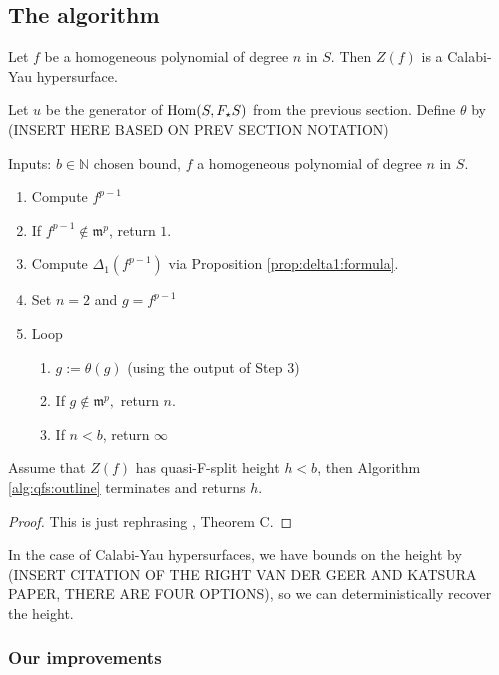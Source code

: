 \subsection{The algorithm}

Let \(f\) be a homogeneous polynomial of degree \(n\) 
in \(S\). 
Then \(Z(f)\) is a Calabi-Yau hypersurface.

Let \(u\) be the generator of \(\operatorname{Hom}(S,F_{\star}S)\) from the 
previous section.
Define \(\theta\) by  (INSERT HERE BASED ON PREV SECTION NOTATION)

\begin{alg}
	\label{alg:qfs:outline}

	Inputs: \(b \in \mathbb{N}\) chosen bound, \(f\) a homogeneous
	polynomial of degree \(n\) in \(S\).
	\begin{enumerate}[(1)]
		\item Compute \(f^{p-1}\)
		\item If \(f^{p-1} \notin \mathfrak{m}^{p}\), return \(1\). 
		\item Compute \(\Delta_{1}(f^{p-1})\) via Proposition \ref{prop:delta1:formula}.
		\item Set \(n = 2\) and \(g = f^{p-1}\)
		\item Loop
			\begin{enumerate}[(1)]
				\item \(g := \theta(g)\) (using the output of Step 3)
				\item If \(g \notin \mathfrak{m}^{p},\) return \(n\).
				\item If \(n < b\), return \(\infty\)	
			\end{enumerate}
	\end{enumerate}
\end{alg}

\begin{thm}
	Assume that
	\(Z(f)\) has quasi-F-split height \(h < b\),
	then Algorithm \ref{alg:qfs:outline} terminates
	and returns \(h\).
\end{thm}

\begin{proof}
	This is just rephrasing \cite{quasifedder}, Theorem C.
\end{proof}

In the case of Calabi-Yau hypersurfaces, we have bounds on the height by
(INSERT CITATION OF THE RIGHT VAN DER GEER AND KATSURA PAPER, THERE ARE FOUR OPTIONS), 
so we can deterministically recover the height.  

\subsubsection{Our improvements}


